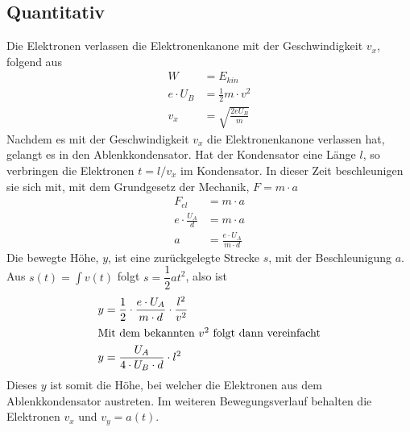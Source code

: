 \documentclass{article}
\begin{document}
\subsection{Quantitativ} 
Die Elektronen verlassen die Elektronenkanone mit der Geschwindigkeit $v_x$, folgend aus
\begin{align*}
 W &= E_{kin} \\
 e \cdot U_B &= \frac{1}{2} m \cdot v^2 \\
 v_x &= \sqrt{\frac{2 eU_B}{m}}
\end{align*}
Nachdem es mit der Geschwindigkeit $v_x$ die Elektronenkanone verlassen hat, gelangt es in den Ablenkkondensator. Hat der Kondensator eine Länge $l$, so verbringen die Elektronen $t=l/v_x$ im Kondensator. In dieser Zeit beschleunigen sie sich mit, mit dem Grundgesetz der Mechanik, $F= m \cdot a$
\begin{align*}
 F_{el} &= m \cdot a \\ 
 e \cdot \frac{U_A}{d} &= m \cdot a \\ 
 a &= \frac{e \cdot U_A}{m \cdot d} 
\end{align*}
Die bewegte Höhe, $y$, ist eine zurückgelegte Strecke $s$, mit der Beschleunigung $a$. Aus $\displaystyle {s(t) = \int v(t)}$ folgt ${s = \dfrac{1}{2}at^2}$, also ist
\begin{align*} 
 y &= \frac{1}{2} \cdot \frac{e \cdot U_A}{m \cdot d} \cdot \frac{l^2}{v^2} \\
\intertext{Mit dem bekannten $v^2$ folgt dann vereinfacht} 
 y &= \frac{U_A}{4 \cdot U_B \cdot d} \cdot l^2
\end{align*}
Dieses $y$ ist somit die Höhe, bei welcher die Elektronen aus dem Ablenkkondensator austreten. Im weiteren Bewegungsverlauf behalten die Elektronen $v_x$ und $v_y = a(t)$.
 
 
\end{document}
